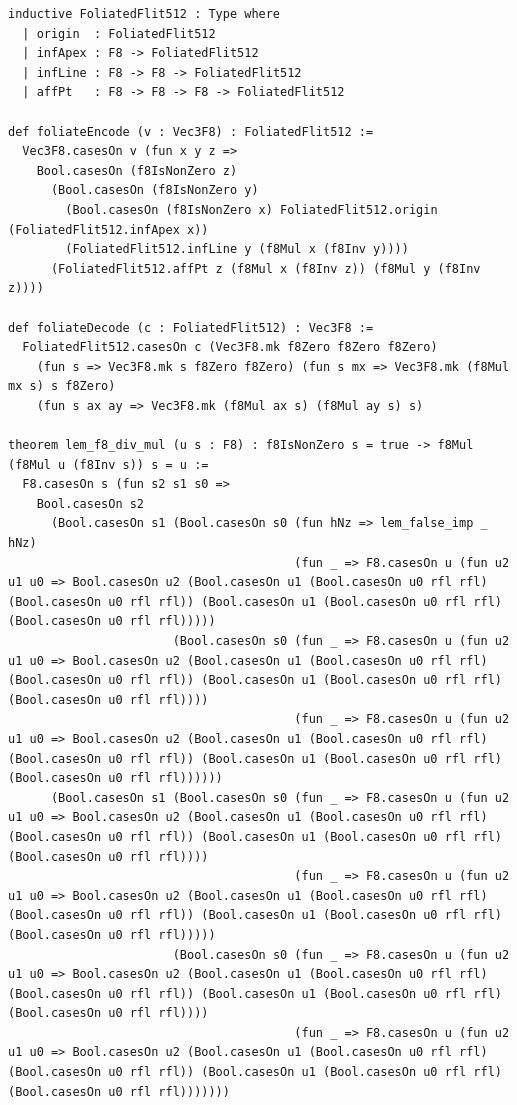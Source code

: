 \documentclass[11pt,letterpaper]{article}
\theoremstyle{spectralthm}
\begin{document}
\begin{lstlisting}[language=Lean4,caption={Standalone Pure Init.Prelude Term-Mode Lean 4 Kernel Suite (thm30--thm61, v0.0.0, 0 sorry, 0 axioms).},label={lst:lean_unified}]
inductive FoliatedFlit512 : Type where
  | origin  : FoliatedFlit512
  | infApex : F8 -> FoliatedFlit512
  | infLine : F8 -> F8 -> FoliatedFlit512
  | affPt   : F8 -> F8 -> F8 -> FoliatedFlit512

def foliateEncode (v : Vec3F8) : FoliatedFlit512 :=
  Vec3F8.casesOn v (fun x y z =>
    Bool.casesOn (f8IsNonZero z)
      (Bool.casesOn (f8IsNonZero y)
        (Bool.casesOn (f8IsNonZero x) FoliatedFlit512.origin (FoliatedFlit512.infApex x))
        (FoliatedFlit512.infLine y (f8Mul x (f8Inv y))))
      (FoliatedFlit512.affPt z (f8Mul x (f8Inv z)) (f8Mul y (f8Inv z))))

def foliateDecode (c : FoliatedFlit512) : Vec3F8 :=
  FoliatedFlit512.casesOn c (Vec3F8.mk f8Zero f8Zero f8Zero)
    (fun s => Vec3F8.mk s f8Zero f8Zero) (fun s mx => Vec3F8.mk (f8Mul mx s) s f8Zero)
    (fun s ax ay => Vec3F8.mk (f8Mul ax s) (f8Mul ay s) s)

theorem lem_f8_div_mul (u s : F8) : f8IsNonZero s = true -> f8Mul (f8Mul u (f8Inv s)) s = u :=
  F8.casesOn s (fun s2 s1 s0 =>
    Bool.casesOn s2
      (Bool.casesOn s1 (Bool.casesOn s0 (fun hNz => lem_false_imp _ hNz)
                                        (fun _ => F8.casesOn u (fun u2 u1 u0 => Bool.casesOn u2 (Bool.casesOn u1 (Bool.casesOn u0 rfl rfl) (Bool.casesOn u0 rfl rfl)) (Bool.casesOn u1 (Bool.casesOn u0 rfl rfl) (Bool.casesOn u0 rfl rfl)))))
                       (Bool.casesOn s0 (fun _ => F8.casesOn u (fun u2 u1 u0 => Bool.casesOn u2 (Bool.casesOn u1 (Bool.casesOn u0 rfl rfl) (Bool.casesOn u0 rfl rfl)) (Bool.casesOn u1 (Bool.casesOn u0 rfl rfl) (Bool.casesOn u0 rfl rfl))))
                                        (fun _ => F8.casesOn u (fun u2 u1 u0 => Bool.casesOn u2 (Bool.casesOn u1 (Bool.casesOn u0 rfl rfl) (Bool.casesOn u0 rfl rfl)) (Bool.casesOn u1 (Bool.casesOn u0 rfl rfl) (Bool.casesOn u0 rfl rfl))))))
      (Bool.casesOn s1 (Bool.casesOn s0 (fun _ => F8.casesOn u (fun u2 u1 u0 => Bool.casesOn u2 (Bool.casesOn u1 (Bool.casesOn u0 rfl rfl) (Bool.casesOn u0 rfl rfl)) (Bool.casesOn u1 (Bool.casesOn u0 rfl rfl) (Bool.casesOn u0 rfl rfl))))
                                        (fun _ => F8.casesOn u (fun u2 u1 u0 => Bool.casesOn u2 (Bool.casesOn u1 (Bool.casesOn u0 rfl rfl) (Bool.casesOn u0 rfl rfl)) (Bool.casesOn u1 (Bool.casesOn u0 rfl rfl) (Bool.casesOn u0 rfl rfl)))))
                       (Bool.casesOn s0 (fun _ => F8.casesOn u (fun u2 u1 u0 => Bool.casesOn u2 (Bool.casesOn u1 (Bool.casesOn u0 rfl rfl) (Bool.casesOn u0 rfl rfl)) (Bool.casesOn u1 (Bool.casesOn u0 rfl rfl) (Bool.casesOn u0 rfl rfl))))
                                        (fun _ => F8.casesOn u (fun u2 u1 u0 => Bool.casesOn u2 (Bool.casesOn u1 (Bool.casesOn u0 rfl rfl) (Bool.casesOn u0 rfl rfl)) (Bool.casesOn u1 (Bool.casesOn u0 rfl rfl) (Bool.casesOn u0 rfl rfl)))))))


\end{lstlisting}
\end{document}
